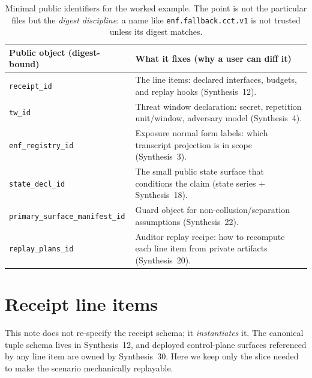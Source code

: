 \documentclass[11pt]{article}
\begin{document}
\begin{table}[t]
\centering
\small
\begin{tabularx}{\linewidth}{@{}Y Y@{}}
\toprule
Public object (digest-bound) & What it fixes (why a user can diff it)\\
\midrule
\texttt{receipt\_id} & The line items: declared interfaces, budgets, and replay hooks (Synthesis~12).\\
\texttt{tw\_id} & Threat window declaration: secret, repetition unit/window, adversary model (Synthesis~4).\\
\texttt{enf\_registry\_id} & Exposure normal form labels: which transcript projection is in scope (Synthesis~3).\\
\texttt{state\_decl\_id} & The small public state surface that conditions the claim (state series + Synthesis~18).\\
\texttt{primary\_surface\_manifest\_id} & Guard object for non-collusion/separation assumptions (Synthesis~22).\\
\texttt{replay\_plans\_id} & Auditor replay recipe: how to recompute each line item from private artifacts (Synthesis~20).\\
\bottomrule
\end{tabularx}
\caption{Minimal public identifiers for the worked example. The point is not the particular files but the \emph{digest discipline}: a name like \texttt{enf.fallback.cct.v1} is not trusted unless its digest matches.}
\label{tab:min-public-ids}
\end{table}

\section{Receipt line items}
\label{sec:lineitems}
This note does not re-specify the receipt schema; it \emph{instantiates} it.
The canonical tuple schema lives in Synthesis~12, and deployed control-plane surfaces referenced by any line item are owned by Synthesis~30.\cite{series:receiptitems,series:deployedsurfaces}
Here we keep only the slice needed to make the scenario mechanically replayable.
\end{document}

